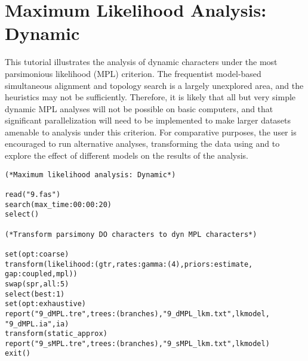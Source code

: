 
\section{Maximum Likelihood Analysis: Dynamic}{\label{tutorial15}}
This tutorial illustrates the analysis of dynamic characters under
the most parsimonious likelihood (MPL) criterion. The frequentist
model-based simultaneous alignment and topology search is a largely
unexplored area, and the heuristics may not be sufficiently.
Therefore, it is likely that all but very simple dynamic MPL analyses
will not be possible on basic computers, and that significant parallelization
will need to be implemented to make larger datasets amenable to
analysis under this criterion. For comparative purposes, the user
is encouraged to run alternative analyses, transforming the data
using  and to explore the effect of different
models on the results of the analysis.

\begin{verbatim}
(*Maximum likelihood analysis: Dynamic*)

read("9.fas")
search(max_time:00:00:20)
select()

(*Transform parsimony DO characters to dyn MPL characters*)

set(opt:coarse)
transform(likelihood:(gtr,rates:gamma:(4),priors:estimate, 
gap:coupled,mpl))
swap(spr,all:5)
select(best:1)
set(opt:exhaustive)
report("9_dMPL.tre",trees:(branches),"9_dMPL_lkm.txt",lkmodel,
"9_dMPL.ia",ia)
transform(static_approx)
report("9_sMPL.tre",trees:(branches),"9_sMPL_lkm.txt",lkmodel)
exit()
\end{verbatim}

